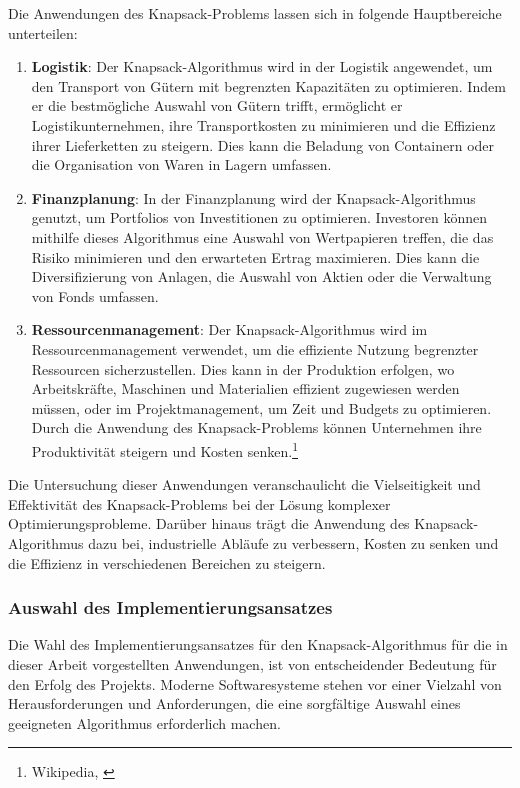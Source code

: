 Die Anwendungen des Knapsack-Problems lassen sich in folgende Hauptbereiche unterteilen:
\begin{enumerate}
\item \textbf{Logistik}: Der Knapsack-Algorithmus wird in der Logistik angewendet, um den Transport von Gütern mit
begrenzten Kapazitäten zu optimieren. Indem er die bestmögliche Auswahl von Gütern trifft, ermöglicht er Logistikunternehmen,
ihre Transportkosten zu minimieren und die Effizienz ihrer Lieferketten zu steigern. Dies kann die Beladung von Containern oder die Organisation von Waren in Lagern umfassen.
\item \textbf{Finanzplanung}: In der Finanzplanung wird der Knapsack-Algorithmus genutzt, um Portfolios von Investitionen
zu optimieren. Investoren können mithilfe dieses Algorithmus eine Auswahl von Wertpapieren treffen, die das Risiko
minimieren und den erwarteten Ertrag maximieren. Dies kann die Diversifizierung von Anlagen, die Auswahl von Aktien
oder die Verwaltung von Fonds umfassen.
\item \textbf{Ressourcenmanagement}: Der Knapsack-Algorithmus wird im Ressourcenmanagement verwendet, um die effiziente
Nutzung begrenzter Ressourcen sicherzustellen. Dies kann in der Produktion erfolgen, wo Arbeitskräfte, Maschinen und
Materialien effizient zugewiesen werden müssen, oder im Projektmanagement, um Zeit und Budgets zu optimieren. Durch
die Anwendung des Knapsack-Problems können Unternehmen ihre Produktivität steigern und Kosten senken.\footnote{Wikipedia, \cite{Knapsack-Problem Anwendungen}}
\end{enumerate}

Die Untersuchung dieser Anwendungen veranschaulicht die Vielseitigkeit und Effektivität des Knapsack-Problems bei der Lösung
komplexer Optimierungsprobleme. Darüber hinaus trägt die Anwendung des Knapsack-Algorithmus dazu bei, industrielle Abläufe
zu verbessern, Kosten zu senken und die Effizienz in verschiedenen Bereichen zu steigern.

\subsubsection{Auswahl des Implementierungsansatzes}
Die Wahl des Implementierungsansatzes für den Knapsack-Algorithmus für die in dieser Arbeit vorgestellten Anwendungen, ist von entscheidender Bedeutung
für den Erfolg des Projekts. Moderne Softwaresysteme stehen vor einer Vielzahl von Herausforderungen und Anforderungen,
die eine sorgfältige Auswahl eines geeigneten Algorithmus erforderlich machen.

